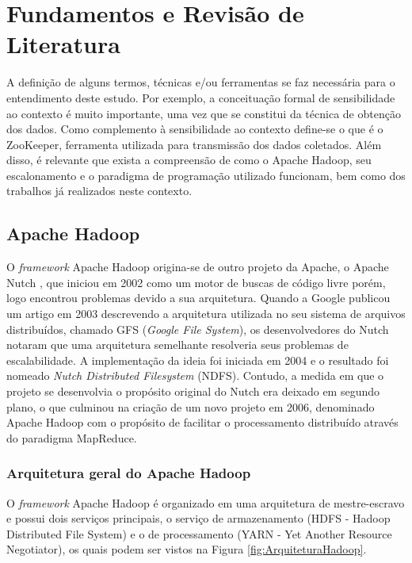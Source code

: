 \chapter{Fundamentos e Revisão de Literatura}
\label{chap:fundamentacao}
A definição de alguns termos, técnicas e/ou ferramentas se faz necessária para o entendimento deste estudo. Por exemplo, a conceituação formal de sensibilidade ao contexto é muito importante, uma vez que se constitui da técnica de obtenção dos dados. Como complemento à sensibilidade ao contexto define-se o que é o ZooKeeper, ferramenta utilizada para transmissão dos dados coletados. Além disso, é relevante que exista a compreensão de como o Apache Hadoop, seu escalonamento e o paradigma de programação utilizado funcionam, bem como dos trabalhos já realizados neste contexto.



\section{Apache Hadoop}
O \textit{framework} Apache Hadoop origina-se de outro projeto da Apache, o Apache Nutch \cite{Nutch}, que iniciou em 2002 como um motor de buscas de código livre porém, logo encontrou problemas devido a sua arquitetura. Quando a Google publicou um artigo em 2003 descrevendo a arquitetura utilizada no seu sistema de arquivos distribuídos, chamado GFS (\textit{Google File System}), os desenvolvedores do Nutch notaram que uma arquitetura semelhante resolveria seus problemas de escalabilidade. A implementação da ideia foi iniciada em 2004 e o resultado foi nomeado \textit{Nutch Distributed Filesystem} (NDFS). Contudo, a medida em que o projeto se desenvolvia o propósito original do Nutch era deixado em segundo plano, o que culminou na criação de um novo projeto em 2006, denominado Apache Hadoop com o propósito de facilitar o processamento distribuído através do paradigma MapReduce.

\subsection{Arquitetura geral do Apache Hadoop}
O \textit{framework} Apache Hadoop é organizado em uma arquitetura de mestre-escravo e possui dois serviços principais, o serviço de armazenamento (HDFS - Hadoop Distributed File System) e o de processamento (YARN - Yet Another Resource Negotiator), os quais podem ser vistos na Figura \ref{fig:ArquiteturaHadoop}.

